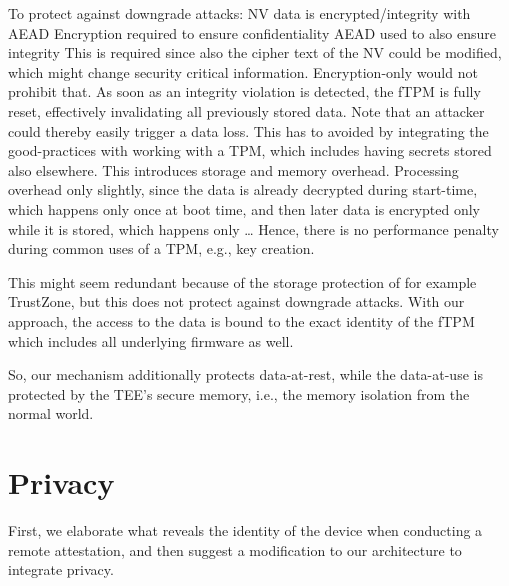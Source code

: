 
To protect against downgrade attacks:
NV data is encrypted/integrity with AEAD
Encryption required to ensure confidentiality
AEAD used to also ensure integrity
This is required since also the cipher text of the NV could be modified, which might change security critical information.
Encryption-only would not prohibit that.
As soon as an integrity violation is detected, the \ac{fTPM} is fully reset, effectively invalidating all previously stored data.
Note that an attacker could thereby easily trigger a data loss.
This has to avoided by integrating the good-practices with working with a \ac{TPM}, which includes having secrets stored also elsewhere. %
This introduces storage and memory overhead.
Processing overhead only slightly, since the data is already decrypted during start-time, which happens only once at boot time, and then later data is encrypted only while it is stored, which happens only \ldots %
Hence, there is no performance penalty during common uses of a \ac{TPM}, e.g., key creation.

This might seem redundant because of the storage protection of for example TrustZone, but this does not protect against downgrade attacks.
With our approach, the access to the data is bound to the exact identity of the fTPM which includes all underlying firmware as well.

So, our mechanism additionally protects data-at-rest, while the data-at-use is protected by the TEE's secure memory, i.e., the memory isolation from the normal world.


\section{Privacy}\label{sec:privacy}

First, we elaborate what reveals the identity of the device when conducting a remote attestation, and then suggest a modification to our architecture to integrate privacy.

